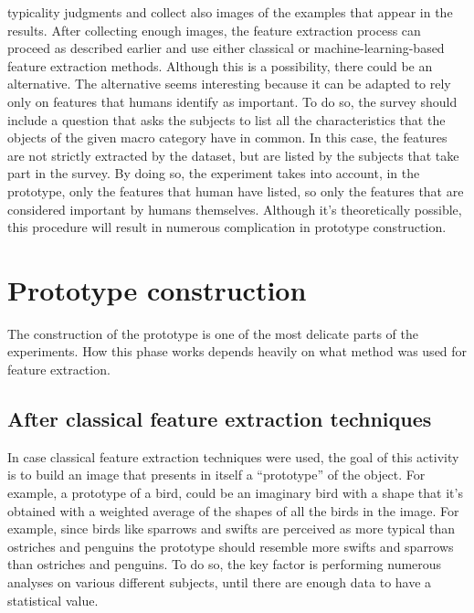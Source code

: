\documentclass[conference]{IEEEtran}
\begin{document}
		typicality judgments and collect also images of the examples that appear in the results. After collecting enough images, the feature extraction process can proceed as described earlier and use either  
		classical or machine-learning-based feature extraction methods. Although this is a possibility, there could be an alternative. The alternative seems interesting because it can be adapted to rely only on features 
		that humans identify as important. To do so, the survey should include a question that asks the subjects to list all the characteristics that the objects of the given macro category have in common. In this case, 
		the features are not strictly extracted by the dataset, but are listed by the subjects that take part in the survey. By doing so, the experiment takes into account, in the prototype, only the features that 
		human have listed, so only the features that are considered important by humans themselves. Although it's theoretically possible, this procedure will result in numerous complication in prototype construction. 
		

	\section{Prototype construction}

		\noindent The construction of the prototype is one of the most delicate parts of the experiments. How this phase works depends heavily on what method was used for feature extraction. 
		
		\subsection{After classical feature extraction techniques\label{sec:cfet}}
		
			\noindent In case classical feature extraction techniques were used, the goal of this activity is to build an image that presents in itself a ``prototype'' of the object. For example, a prototype of a bird, could be 
			an imaginary bird with a shape that it's obtained with a weighted average of the shapes of all the birds in the image. For example, since birds like sparrows and swifts are perceived as more 
			typical than ostriches and penguins the prototype should resemble more swifts and sparrows than ostriches and penguins. To do so, the key factor is performing numerous analyses on various 
			different subjects, until there are enough data to have a statistical value. 
			
\end{document}
